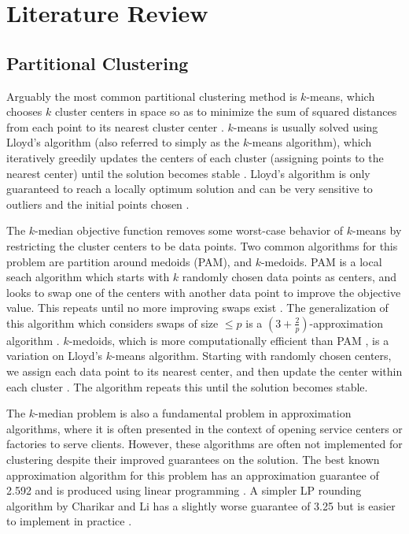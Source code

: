 \documentclass[conference, 10pt, final]{IEEEtran}
\begin{document}
\section{Literature Review}

\subsection{Partitional Clustering}
Arguably the most common partitional clustering method is $k$-means, which chooses $k$ cluster centers in space so as to minimize the sum of squared distances from each point to its nearest cluster center \cite{Jain}.  $k$-means is usually solved using Lloyd's algorithm (also referred to simply as the $k$-means algorithm), which iteratively greedily updates the centers of each cluster (assigning points to the nearest center) until the solution becomes stable \cite{Jain}. Lloyd's algorithm is only guaranteed to reach a locally optimum solution and can be very sensitive to outliers and the initial points chosen \cite{Kanungo}.

The $k$-median objective function removes some worst-case behavior of $k$-means by restricting the cluster centers to be data points.  Two common algorithms for this problem are partition around medoids (PAM), and $k$-medoids. PAM is a local seach algorithm which starts with $k$ randomly chosen data points as centers, and looks to swap one of the centers with another data point to improve the objective value. This repeats until no more improving swaps exist \cite{ESL}. The generalization of this algorithm which considers swaps of size $\leq p$ is a $(3 + \frac{2}{p})$-approximation algorithm \cite{Arya}.
$k$-medoids, which is more computationally efficient than PAM \cite{Park}, is a variation on Lloyd's $k$-means algorithm.  Starting with randomly chosen centers, we assign each data point to its nearest center, and then update the center within each cluster \cite{Park}. The algorithm repeats this until the solution becomes stable.

The $k$-median problem is also a fundamental problem in approximation algorithms, where it is often presented in the context of opening service centers or factories to serve clients. However, these algorithms are often not implemented for clustering despite their improved guarantees on the solution. The best known approximation algorithm for this problem has an approximation guarantee of 2.592 and is produced using linear programming \cite{Wu}. A simpler LP rounding algorithm by Charikar and Li has a slightly worse guarantee of 3.25 but is easier to implement in practice \cite{Charikar}. 
\end{document}
